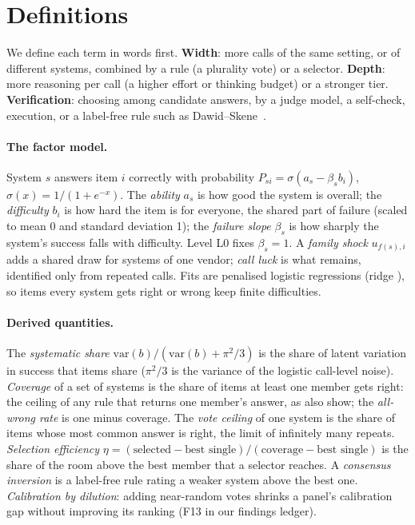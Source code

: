 \documentclass{article}
\begin{document}
\section{Definitions}
\label{sec:defs}

We define each term in words first.
\textbf{Width}: more calls of the same setting, or of different systems, combined by a rule (a plurality vote) or a
selector. \textbf{Depth}: more reasoning per call (a higher effort or thinking budget) or a stronger tier.
\textbf{Verification}: choosing among candidate answers, by a judge model, a self-check, execution, or a label-free
rule such as Dawid--Skene~\cite{dawid1979}.

\paragraph{The factor model.} System $s$ answers item $i$ correctly with probability
$P_{si} = \sigma(a_s - \beta_s b_i)$, $\sigma(x) = 1/(1+e^{-x})$. The \emph{ability} $a_s$ is how good the system is
overall; the \emph{difficulty} $b_i$ is how hard the item is for everyone, the shared part of failure (scaled to mean 0
and standard deviation 1); the \emph{failure slope} $\beta_s$ is how sharply the system's success falls with
difficulty. Level L0 fixes $\beta_s = 1$. A \emph{family shock} $u_{f(s),i}$ adds a shared draw for systems of one
vendor; \emph{call luck} is what remains, identified only from repeated calls. Fits are penalised logistic
regressions (ridge ), so items every system gets right or wrong keep finite difficulties.

\paragraph{Derived quantities.} The \emph{systematic share} $\mathrm{var}(b)/(\mathrm{var}(b)+\pi^2/3)$ is the share of
latent variation in success that items share ($\pi^2/3$ is the variance of the logistic call-level noise).
\emph{Coverage} of a set of systems is the share of items at least one member gets right: the ceiling of any rule that
returns one member's answer, as \citet{chen2026cofailure} also show; the \emph{all-wrong rate} is one minus coverage.
The \emph{vote ceiling} of one system is the share of items whose most common answer is right, the limit of infinitely
many repeats. \emph{Selection efficiency} $\eta = (\text{selected} - \text{best single})/(\text{coverage} - \text{best
single})$ is the share of the room above the best member that a selector reaches. A \emph{consensus inversion} is a
label-free rule rating a weaker system above the best one. \emph{Calibration by dilution}: adding near-random votes
shrinks a panel's calibration gap without improving its ranking (F13 in our findings ledger).
\end{document}
